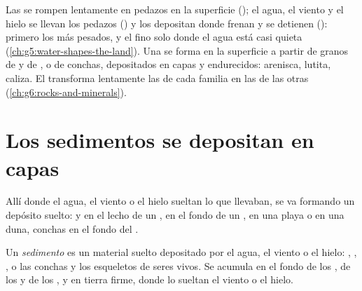 \begin{recall}
Las  se rompen lentamente en pedazos en la superficie
(\emph{}); el agua, el viento y el hielo se llevan los
pedazos (\emph{}) y los depositan donde frenan y se detienen
(\emph{}): primero los más pesados, y el  fino solo donde
el agua está casi quieta (\cref{ch:g5:water-shapes-the-land}). Una
\emph{} se forma en la superficie a partir de granos de
 y de , o de conchas, depositados en capas y endurecidos:
arenisca, lutita, caliza. El  transforma lentamente las
 de cada familia en las de las otras (\cref{ch:g6:rocks-and-minerals}).
\end{recall}

\section{Los sedimentos se depositan en capas}

Allí donde el agua, el viento o el hielo sueltan lo que llevaban, se va
formando un depósito suelto:  y  en el lecho de un ,  en
el fondo de un ,  en una playa o en una duna, conchas en el fondo
del .

\begin{definition}[Sedimento]\label{def:g7:sediments-and-fossils:sediment}
Un \emph{sedimento} es un material suelto depositado por
el agua, el viento o el hielo: , , , o las conchas y los
esqueletos de seres vivos. Se acumula en el fondo de los , de los
 y de los , y en tierra firme, donde lo sueltan el viento o el
hielo.
\end{definition}

